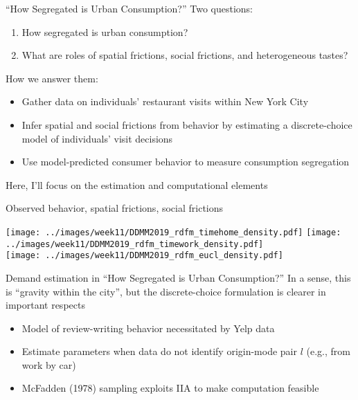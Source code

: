 \documentclass[11pt,notes=hide,aspectratio=169]{beamer}
\begin{document}
\begin{frame}{``How Segregated is Urban Consumption?''}
Two questions:
\begin{enumerate}
	\item How segregated is urban consumption?
	\item What are roles of spatial frictions, social frictions, and heterogeneous tastes?
\end{enumerate}
How we answer them:
\begin{itemize}
	\item Gather data on individuals' restaurant visits within New York City
	\item Infer spatial and social frictions from behavior by estimating a discrete-choice model of individuals' visit decisions
	\item Use model-predicted consumer behavior to measure consumption segregation
\end{itemize}
\medskip
Here, I'll focus on the estimation and computational elements
\end{frame}
\begin{frame}{Observed behavior, spatial frictions, social frictions}
\vspace{-1mm}
\begin{center}
\texttt{[image: ../images/week11/DDMM2019\_rdfm\_timehome\_density.pdf]}
\texttt{[image: ../images/week11/DDMM2019\_rdfm\_timework\_density.pdf]}\\
\texttt{[image: ../images/week11/DDMM2019\_rdfm\_eucl\_density.pdf]}
\end{center}
\end{frame}
\begin{frame}{Demand estimation in ``How Segregated is Urban Consumption?''}
In a sense, this is ``gravity within the city'', but the discrete-choice formulation is clearer in important respects
\begin{itemize}
\item Model of review-writing behavior necessitated by Yelp data
\item Estimate parameters when data do not identify origin-mode pair $l$ (e.g., from work by car)
\item McFadden (1978) sampling exploits IIA to make computation feasible
\end{itemize}
\end{frame}
\end{document}

